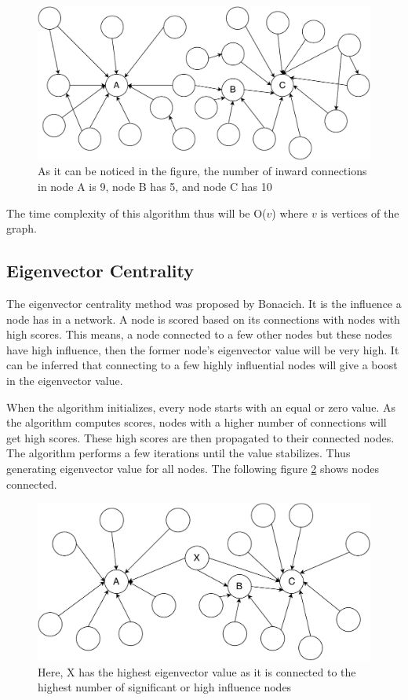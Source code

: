 \documentclass[journal,twoside,web]{ieeecolor}
\begin{document}
\begin{figure}[!h]
    \centerline{\includegraphics[scale=0.45]{figures/degree_centrality.pdf}}
    \caption{As it can be noticed in the figure, the number of inward connections in node A is 9, node B has 5, and node C has 10}
    \label{fig10}
\end{figure}

The time complexity of this algorithm thus will be O($v$) where $v$ is vertices of the graph.

\subsection{Eigenvector Centrality}
The eigenvector centrality method was proposed by Bonacich\cite{26}. It is the influence a node has in a network. A node is scored based on its connections with nodes with high scores. This means, a node connected to a few other nodes but these nodes have high influence, then the former node's eigenvector value will be very high. It can be inferred that connecting to a few highly influential nodes will give a boost in the eigenvector value.

When the algorithm initializes, every node starts with an equal or zero value. As the algorithm computes scores, nodes with a higher number of connections will get high scores. These high scores are then propagated to their connected nodes. The algorithm performs a few iterations until the value stabilizes. Thus generating eigenvector value for all nodes. The following figure \ref{fig11} shows nodes connected.

\begin{figure}[!h]
    \centerline{\includegraphics[scale=0.45]{figures/eigenvector_centrality.pdf}}
    \caption{Here, X has the highest eigenvector value as it is connected to the highest number of significant or high influence nodes}
    \label{fig11}
\end{figure}
\end{document}
